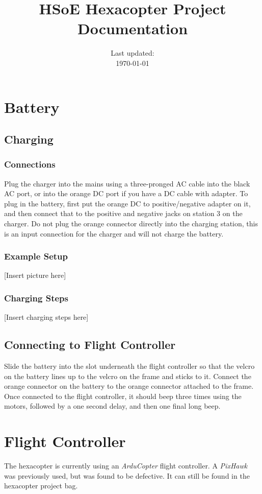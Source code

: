 \documentclass{style}
\title{HSoE Hexacopter Project Documentation}
\author{\linkurl{https://github.com/nickgn12/hsoe-hexacopter-docs}}
\date{Last updated:\\ \today{}}
\begin{document}
\maketitle
\newpage
\tableofcontents
\newpage
\section{Battery}
\subsection{Charging}
\subsubsection{Connections}
Plug the charger into the mains using a three-pronged AC cable into the black AC port, or into the orange DC port if you have a DC cable with adapter.
To plug in the battery, first put the orange DC to positive/negative adapter on it, and then connect that to the positive and negative jacks on station 3 on the charger.
Do not plug the orange connector directly into the charging station, this is an input connection for the charger and will not charge the battery.
\subsubsection{Example Setup}
[Insert picture here]
\subsubsection{Charging Steps}
[Insert charging steps here]
\subsection{Connecting to Flight Controller}
Slide the battery into the slot underneath the flight controller so that the velcro on the battery lines up to the velcro on the frame and sticks to it.
Connect the orange connector on the battery to the orange connector attached to the frame.
Once connected to the flight controller, it should beep three times using the motors, followed by a one second delay, and then one final long beep.
\section{Flight Controller}
The hexacopter is currently using an \textit{ArduCopter} flight controller.
A \textit{PixHawk} was previously used, but was found to be defective.
It can still be found in the hexacopter project bag.
\end{document}
